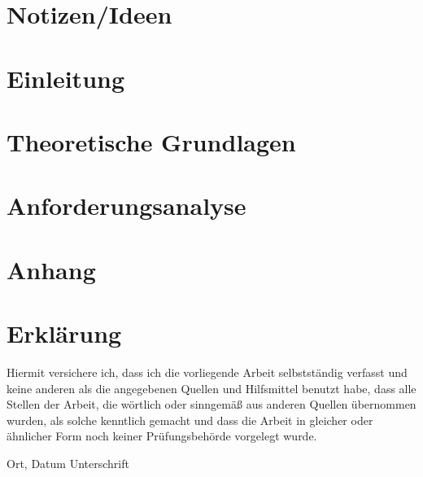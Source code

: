 \chapter*{Notizen/Ideen}


\chapter{Einleitung} \label{c.einleitung}

\newpage
\chapter{Theoretische Grundlagen}

\newpage
\chapter{Anforderungsanalyse}

\newpage


\appendix
\chapter{Anhang}







\chapter*{Erklärung}

Hiermit versichere ich, dass ich die vorliegende Arbeit selbstständig verfasst und keine anderen als die angegebenen Quellen und Hilfsmittel benutzt habe, dass alle Stellen der Arbeit, die wörtlich oder sinngemäß aus anderen Quellen übernommen wurden, als solche kenntlich gemacht und dass die Arbeit in gleicher oder ähnlicher Form noch keiner Prüfungsbehörde vorgelegt wurde.

\vspace{3cm}
Ort, Datum \hspace{5cm} Unterschrift\\

